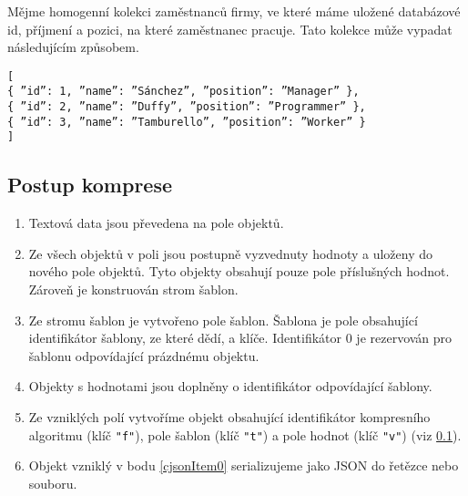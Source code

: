 Mějme homogenní kolekci zaměstnanců firmy, ve které máme uložené databázové id, příjmení a pozici, na které zaměstnanec pracuje. Tato kolekce může vypadat následujícím způsobem.

\texttt{[\\
\hspace*{5mm}\{ \textquotedblright id\textquotedblright : 1, \textquotedblright name\textquotedblright : \textquotedblright Sánchez\textquotedblright, \textquotedblright position\textquotedblright : \textquotedblright Manager\textquotedblright\ \},\\
\hspace*{5mm}\{ \textquotedblright id\textquotedblright : 2, \textquotedblright name\textquotedblright : \textquotedblright Duffy\textquotedblright, \textquotedblright position\textquotedblright : \textquotedblright Programmer\textquotedblright\ \},\\
\hspace*{5mm}\{ \textquotedblright id\textquotedblright : 3, \textquotedblright name\textquotedblright : \textquotedblright Tamburello\textquotedblright, \textquotedblright position\textquotedblright : \textquotedblright Worker\textquotedblright\ \}\\
]}

\subsection{Postup komprese}
\label{cjsonPoKompresi}
\begin{enumerate}
\item Textová data jsou převedena na pole objektů.
\item Ze všech objektů v poli jsou postupně vyzvednuty hodnoty a uloženy do nového pole objektů. Tyto objekty obsahují pouze pole příslušných hodnot. Zároveň je konstruován strom šablon.
\item Ze stromu šablon je vytvořeno pole šablon. Šablona je pole obsahující identifikátor šablony, ze které dědí, a klíče. Identifikátor 0 je rezervován pro šablonu odpovídající prázdnému objektu.
\item Objekty s hodnotami jsou doplněny o identifikátor odpovídající šablony.
\item \label{cjsonItem0}Ze vzniklých polí vytvoříme objekt obsahující identifikátor kompresního algoritmu (klíč \texttt{"f"}), pole šablon (klíč \texttt{"t"}) a pole hodnot (klíč \texttt{"v"}) (viz \ref{cjsonPoKompresi}).
\item Objekt vzniklý v bodu \ref{cjsonItem0} serializujeme jako JSON do řetězce nebo souboru.
\end{enumerate}

